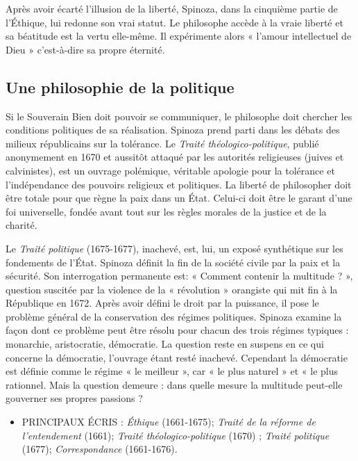 Après avoir écarté l'illusion de la liberté,
Spinoza, dans la cinquième partie de
l'Éthique, lui redonne son vrai statut. Le
philosophe accède à la vraie liberté et sa
béatitude est la vertu elle-même. Il
expérimente alors « l'amour intellectuel
de Dieu » c’est-à-dire sa propre éternité.

\subsection{Une philosophie de la politique}

Si le Souverain Bien doit pouvoir se
communiquer, le philosophe doit chercher les conditions politiques de sa réalisation. Spinoza prend parti dans les
débats des milieux républicains sur la
tolérance. Le {\it Traité théologico-politique}, publié anonymement en 1670 et
aussitôt attaqué par les autorités religieuses (juives et calvinistes), est un
ouvrage polémique, véritable apologie
pour la tolérance et l'indépendance des
pouvoirs religieux et politiques. La
liberté de philosopher doit être totale
pour que règne la paix dans un État.
Celui-ci doit être le garant d’une foi universelle, fondée avant tout sur les règles
morales de la justice et de la charité.

Le {\it Traité politique} (1675-1677), inachevé, est, lui, un exposé synthétique
sur les fondements de l’État. Spinoza
définit la fin de la société civile par la
paix et la sécurité. Son interrogation permanente est: « Comment contenir la
multitude ? », question suscitée par la
violence de la « révolution » orangiste
qui mit fin à la République en 1672.
Après avoir défini le droit par la puissance, il pose le problème général de la
conservation des régimes politiques.
Spinoza examine la façon dont ce problème peut être résolu pour chacun des
trois régimes typiques : monarchie, aristocratie, démocratie. La question reste
en suspens en ce qui concerne la démocratie, l'ouvrage étant resté inachevé.
Cependant la démocratie est définie
comme le régime « le meilleur », car « le
plus naturel » et « le plus rationnel.
Mais la question demeure : dans quelle
mesure la multitude peut-elle gouverner
ses propres passions ?

\begin{itemize}[leftmargin=1cm, label=, itemsep=1pt]
\item {\footnotesize PRINCIPAUX  ÉCRIS} : {\it Éthique} (1661-1675);  {\it Traité de la réforme de l'entendement} (1661);   {\it Traité théologico-politique} (1670) ;   {\it Traité politique} (1677);  {\it Correspondance} (1661-1676).
\end{itemize}


